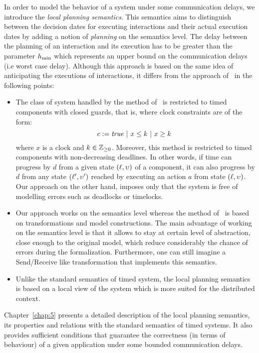 In order to model the behavior of a system under some communication delays, 
we introduce the \emph{local planning 
semantics}. This semantics aims to distinguish between the decision dates for executing 
interactions and their actual execution dates by adding a notion of \emph{planning} on 
the semantics level. The delay between the planning of an interaction and its execution has to
be greater than the parameter $h_{\min}$ which represents an upper bound on the communication delays
(i.e worst case delay). Although this approach 
is based on the same idea of anticipating the executions of interactions, it differs from 
the approach of~\cite{ahlem_these} in the following points:
\begin{itemize}
  \item The class of system handled by the method of~\cite{ahlem_these} is restricted to 
    timed components with closed guards, that is, where clock constraints are of the form:
    \begin{displaymath}
    c:=\textnormal{\textit{true}} \ | \ x\le k \ |\ x\ge k \
    \end{displaymath}
    where $x$ is a clock and $k\in\mathbb{Z}_{\ge 0}$.
    Moreover, this method is restricted to timed components with non-decreasing deadlines. In
    other words, if time can progress by $d$ from a given state $(\ell,\upsilon)$ of a component, 
    it can also progress by $d$ from any state $(\ell',\upsilon')$ reached by executing an action
    $a$ from state $(\ell,\upsilon)$. Our approach on the other hand, imposes only that 
    the system is free of modelling errors such as deadlocks or timelocks. 
  \item Our approach works on the semantics level whereas the method of~\cite{ahlem_these} 
    is based on 
    transformations and model constructions. The main advantage of working on the semantics
    level is that it allows to stay at certain level of abstraction, close enough to the 
    original model, which reduce considerably the chance of errors during the formalization.
    Furthermore, one can still imagine a Send/Receive like transformation that implements
    this semantics.
  \item Unlike the standard semantics of timed system, 
    the local planning semantics is based on a local view of the system which is more suited
    for the distributed context.  
\end{itemize}
Chapter~\ref{chap:5} presents a detailed description of the local planning semantics, its 
properties and relations with the standard semantics of timed systems. It also provides
sufficient conditions that guarantee the correctness (in terms of behaviour) of a given
application under some bounded communication delays.

